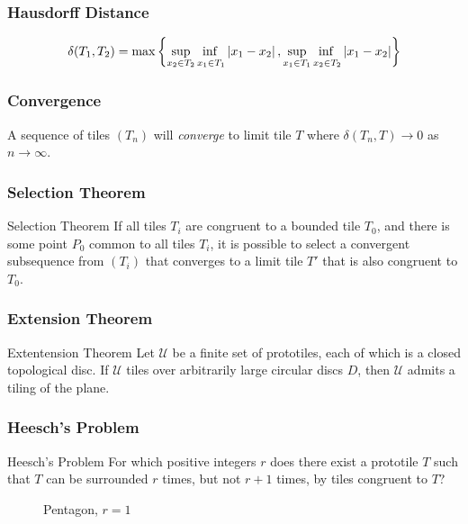 \documentclass{beamer}
\begin{document}
\begin{frame} 
    \frametitle{Hausdorff Distance}
    \begin{equation} 
        \delta (T_1, T_2) = \max \left\{ \adjustlimits\sup_{x_2 \in T_2} \inf_{x_1 \in T_1} \left| x_1 - x_2 \right| , \adjustlimits\sup_{x_1 \in T_1} \inf_{x_2 \in T_2} \left| x_1 - x_2 \right| \right\}
    \end{equation} 
    \begin{figure} 
    \center
    
    \end{figure}
\end{frame} 

\begin{frame} 
    \frametitle{Convergence}
    A sequence of tiles $(T_n)$ will \emph{converge} to limit tile $T$ where $\delta (T_n , T) \rightarrow 0$ as $n \rightarrow \infty$.
    \begin{figure}
        \center
        
    \end{figure} 
\end{frame} 

\begin{frame} 
    \frametitle{Selection Theorem}
    \begin{block}{Selection Theorem} 
    If all tiles $T_i$ are congruent to a bounded tile $T_0$, and there is some point $P_0$ common to all tiles $T_i$, it is possible to select a convergent subsequence from $(T_i)$ that converges to a limit tile $T'$ that is also congruent to $T_0$.
    \end{block}
\end{frame}

\begin{frame} 
    \frametitle{Extension Theorem} 
    \begin{block}{Extentension Theorem} 
    Let $\mathscr{U}$ be a finite set of prototiles, each of which is a closed topological disc.  If $\mathscr{U}$ tiles over arbitrarily large circular discs $D$, then $\mathscr{U}$ admits a tiling of the plane.
    \end{block} 
\end{frame} 

\begin{frame} 
    \frametitle{Heesch's Problem} 
    \begin{block}{Heesch's Problem} 
        For which positive integers $r$ does there exist a prototile $T$ such that $T$ can be surrounded $r$ times, but not $r + 1$ times, by tiles congruent to $T$? 
    \end{block}
    \begin{figure} 
        \center
         
        \caption{Pentagon, $r = 1$} 
    \end{figure} 
\end{frame} 
\end{document}
